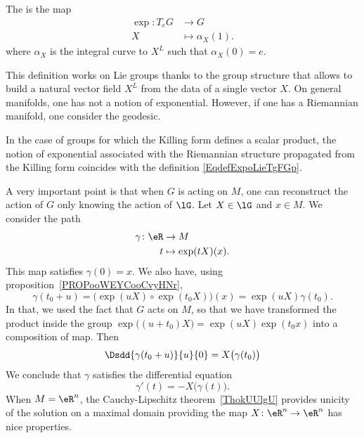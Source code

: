 \begin{definition}
    The  is the map
    \begin{equation}        \label{EqdefExpoLieTgFGp}
        \begin{aligned}
            \exp\colon T_eG&\to G \\
            X&\mapsto \alpha_X(1).
        \end{aligned}
    \end{equation}
    where \( \alpha_X\) is the integral curve to \( X^L\) such that \( \alpha_X(0)=e\).
\end{definition}

This definition works on Lie groups thanks to the group structure that allows to build a natural vector field \( X^L\) from the data of a single vector \( X\). On general manifolds, one has not a notion of exponential. However, if one has a Riemannian manifold, one consider the geodesic.

In the case of groups for which the Killing form defines a scalar product, the notion of exponential associated with the Riemannian structure propagated from the Killing form coincides with the definition \eqref{EqdefExpoLieTgFGp}.

A very important point\cite{ooOLNIooDLmxkR} is that when \( G\) is acting on $M$, one can reconstruct the action of \( G\) only knowing the action of \( \lG\). Let \( X\in \lG\) and \( x\in M\). We consider the path
\begin{equation}
    \begin{aligned}
        \gamma\colon \eR&\to M \\
        t&\mapsto \exp(tX)(x).
    \end{aligned}
\end{equation}
This map satisfies \( \gamma(0)=x\). We also have, using proposition~\ref{PROPooWEYCooCvyHNr},
\begin{equation}
    \gamma(t_0+u)=\big( \exp(uX)\circ\exp(t_0X)\big)(x)=\exp(uX)\gamma(t_0).
\end{equation}
In that, we used the fact that \( G\) acts on \( M\), so that we have transformed the product inside the group \( \exp\big( (u+t_0)X \big)= \exp(uX)\exp(t_0x) \) into a composition of map.  Then
\begin{equation}
    \Dsdd{ \gamma(t_0+u) }{u}{0}=X\big( \gamma(t_0) \big)
\end{equation}
We conclude that \( \gamma\) satisfies the differential equation
\begin{equation}        \label{EQooFGSIooUplbmN}
    \gamma'(t)=-X\big( \gamma(t) \big).
\end{equation}
When \( M=\eR^n\), the Cauchy-Lipschitz theorem~\ref{ThokUUlgU} provides unicity of the solution on a maximal domain providing the map \( X\colon \eR^n\to \eR^n\) has nice properties.


